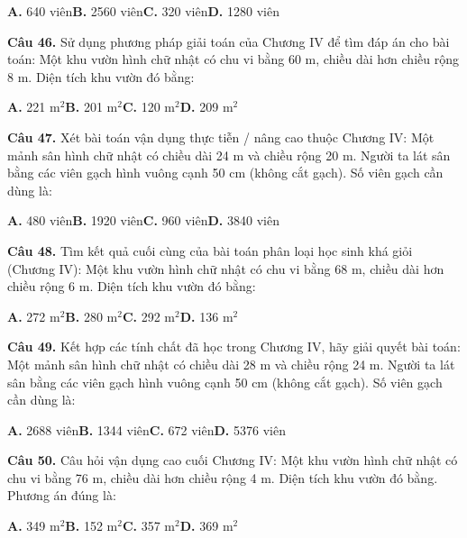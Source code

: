 \documentclass[11pt,a4paper]{article}
\begin{document}
\hspace*{1.5em}\textbf{A.} 640 viên\quad\quad \textbf{B.} 2560 viên\quad\quad \textbf{C.} 320 viên\quad\quad \textbf{D.} 1280 viên\par\vspace{2pt}
\textbf{\color{primary} Câu 46.} Sử dụng phương pháp giải toán của Chương IV để tìm đáp án cho bài toán: Một khu vườn hình chữ nhật có chu vi bằng 60 m, chiều dài hơn chiều rộng 8 m. Diện tích khu vườn đó bằng:\par
\hspace*{1.5em}\textbf{A.} 221 m$^2$\quad\quad \textbf{B.} 201 m$^2$\quad\quad \textbf{C.} 120 m$^2$\quad\quad \textbf{D.} 209 m$^2$\par\vspace{2pt}
\textbf{\color{primary} Câu 47.} Xét bài toán vận dụng thực tiễn / nâng cao thuộc Chương IV: Một mảnh sân hình chữ nhật có chiều dài 24 m và chiều rộng 20 m. Người ta lát sân bằng các viên gạch hình vuông cạnh 50 cm (không cắt gạch). Số viên gạch cần dùng là:\par
\hspace*{1.5em}\textbf{A.} 480 viên\quad\quad \textbf{B.} 1920 viên\quad\quad \textbf{C.} 960 viên\quad\quad \textbf{D.} 3840 viên\par\vspace{2pt}
\textbf{\color{primary} Câu 48.} Tìm kết quả cuối cùng của bài toán phân loại học sinh khá giỏi (Chương IV): Một khu vườn hình chữ nhật có chu vi bằng 68 m, chiều dài hơn chiều rộng 6 m. Diện tích khu vườn đó bằng:\par
\hspace*{1.5em}\textbf{A.} 272 m$^2$\quad\quad \textbf{B.} 280 m$^2$\quad\quad \textbf{C.} 292 m$^2$\quad\quad \textbf{D.} 136 m$^2$\par\vspace{2pt}
\textbf{\color{primary} Câu 49.} Kết hợp các tính chất đã học trong Chương IV, hãy giải quyết bài toán: Một mảnh sân hình chữ nhật có chiều dài 28 m và chiều rộng 24 m. Người ta lát sân bằng các viên gạch hình vuông cạnh 50 cm (không cắt gạch). Số viên gạch cần dùng là:\par
\hspace*{1.5em}\textbf{A.} 2688 viên\quad\quad \textbf{B.} 1344 viên\quad\quad \textbf{C.} 672 viên\quad\quad \textbf{D.} 5376 viên\par\vspace{2pt}
\textbf{\color{primary} Câu 50.} Câu hỏi vận dụng cao cuối Chương IV: Một khu vườn hình chữ nhật có chu vi bằng 76 m, chiều dài hơn chiều rộng 4 m. Diện tích khu vườn đó bằng. Phương án đúng là:\par
\hspace*{1.5em}\textbf{A.} 349 m$^2$\quad\quad \textbf{B.} 152 m$^2$\quad\quad \textbf{C.} 357 m$^2$\quad\quad \textbf{D.} 369 m$^2$\par\vspace{2pt}
\end{document}
